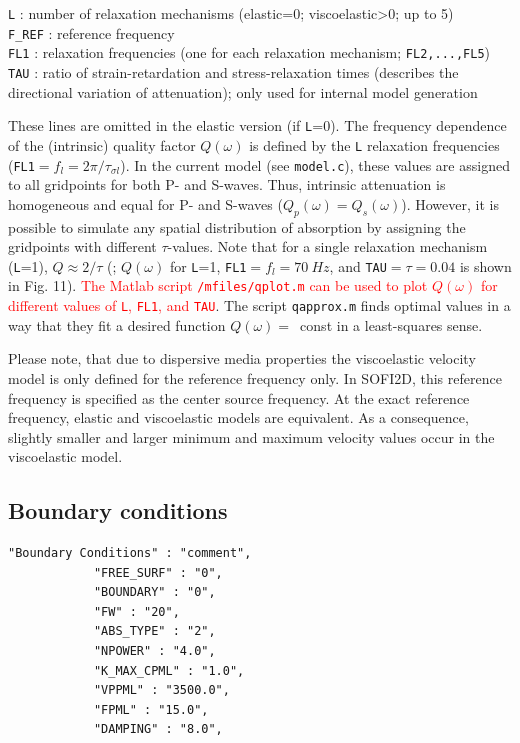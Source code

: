 \texttt{L} : number of relaxation mechanisms (elastic=0; viscoelastic>0; up to 5)\\
\texttt{F\_REF} : reference frequency\\
\texttt{FL1} : relaxation frequencies (one for each relaxation mechanism; \texttt{FL2,...,FL5})\\
\texttt{TAU} : ratio of strain-retardation and stress-relaxation times (describes the directional variation of attenuation); only used for internal model generation

These lines are omitted in the elastic version (if \texttt{L}=0). The frequency dependence of the (intrinsic) quality factor $Q(\omega)$ is defined by the \texttt{L} relaxation frequencies (\texttt{FL1}$=f_l=2\pi/\tau_{\sigma l}$). In the current model (see \texttt{model.c}), these values are assigned to all gridpoints for both P- and S-waves. Thus, intrinsic attenuation is homogeneous and equal for P- and S-waves ($Q_p(\omega)=Q_s(\omega)$). However, it is possible to simulate any spatial distribution of absorption by assigning the gridpoints with different $\tau$-values. Note that for a single relaxation mechanism (\texttt{L}=1), $Q \approx 2/\tau$ (\cite{bohlen:02}; $Q(\omega)$ for \texttt{L}=1, \texttt{FL1}$ =f_l=\SI{70}{Hz}$, and \texttt{TAU}$=\tau=0.04$ is shown in Fig. 11). \textcolor{red}{The Matlab script \texttt{/mfiles/qplot.m} can be used to plot $Q(\omega)$ for different values of \texttt{L}, \texttt{FL1}, and \texttt{TAU}}. The script \texttt{qapprox.m} finds optimal values in a way that they fit a desired function $Q(\omega)=$~const in a least-squares sense.

Please note, that due to dispersive media properties the viscoelastic velocity model is only defined for the reference frequency only. In SOFI2D, this reference frequency is specified as the center source frequency. At the exact reference frequency, elastic and viscoelastic models are equivalent. As a consequence, slightly smaller and larger minimum and maximum velocity values occur in the viscoelastic model.

\subsection{Boundary conditions}
\label{abs}
\begin{verbatim}
"Boundary Conditions" : "comment",
            "FREE_SURF" : "0",
            "BOUNDARY" : "0",
            "FW" : "20",
            "ABS_TYPE" : "2",
            "NPOWER" : "4.0",
            "K_MAX_CPML" : "1.0",
            "VPPML" : "3500.0",
            "FPML" : "15.0",
            "DAMPING" : "8.0",
\end{verbatim}

